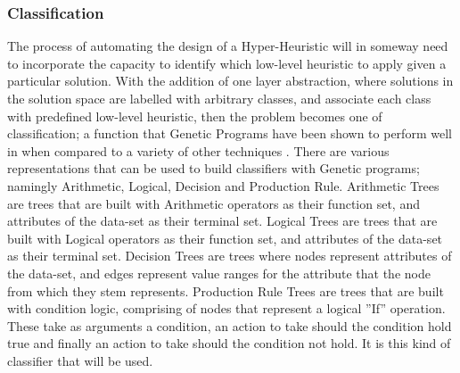 \documentclass[a4paper,12pt]{article}
\begin{document}
                \subsubsection{Classification}
                    \par{
                        \noindent
                        The process of automating the design of a Hyper-Heuristic will in someway need
                        to incorporate the capacity to identify which low-level heuristic to apply given a
                        particular solution. With the addition of one layer abstraction, where solutions
                        in the solution space are labelled with arbitrary classes, and associate each class
                        with predefined low-level heuristic, then the problem becomes one of classification; 
                        a function that Genetic Programs have been shown to perform well in
                        when compared to a variety of other techniques \cite{sgpc}.\newline 
                        \newline 
                        There are various representations that can be used to build classifiers with Genetic 
                        programs; namingly Arithmetic, Logical, Decision and Production Rule.\newline 
                        \newline 
                        Arithmetic Trees are trees that are built with Arithmetic operators as their
                        function set, and attributes of the data-set as their terminal set.\newline 
                        \newline 
                        Logical Trees are trees that are built with Logical operators as their function
                        set, and attributes of the data-set as their terminal set.\newline 
                        \newline 
                        Decision Trees are trees where nodes represent attributes of the data-set, and
                        edges represent value ranges for the attribute that the node from which they
                        stem represents.\newline 
                        \newline 
                        Production Rule Trees are trees that are built with condition logic, comprising 
                        of nodes that represent a logical ”If” operation. These take as arguments a
                        condition, an action to take should the condition hold true and finally an action
                        to take should the condition not hold. It is this kind of classifier that will be used. 
                    }
\end{document}
